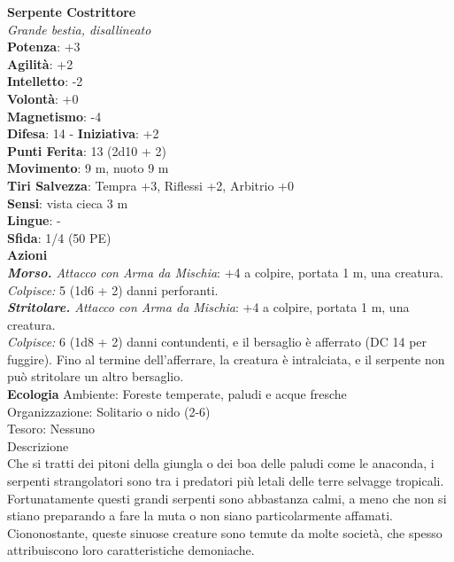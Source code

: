\begin{multicols}{2}
\medskip\textbf{Serpente Costrittore}\\
\emph{Grande bestia, disallineato}\\
\textbf{Potenza}: +3\\
\textbf{Agilità}: +2\\
\textbf{Intelletto}: -2\\
\textbf{Volontà}: +0\\
\textbf{Magnetismo}: -4\\
\textbf{Difesa}: 14 - \textbf{Iniziativa}: +2\\
\textbf{Punti Ferita}: 13 (2d10 + 2)\\
\textbf{Movimento}: 9 m, nuoto 9 m\\
\textbf{Tiri Salvezza}: Tempra +3, Riflessi +2, Arbitrio +0\\
\textbf{Sensi}: vista cieca 3 m\\
\textbf{Lingue}: -\\
\textbf{Sfida}: 1/4 (50 PE)\smallskip\\
\smallskip\textbf{Azioni}\\
\emph{\textbf{Morso.} Attacco con Arma da Mischia}: +4 a colpire, portata 1 m, una creatura.\\
\emph{Colpisce:} 5 (1d6 + 2) danni perforanti.\\
\emph{\textbf{Stritolare.} Attacco con Arma da Mischia}: +4 a colpire, portata 1 m, una creatura.\\
\emph{Colpisce:} 6 (1d8 + 2) danni contundenti, e il bersaglio è afferrato (DC 14 per fuggire). Fino al termine dell'afferrare, la creatura è intralciata, e il serpente non può stritolare un altro bersaglio.\\
\textbf{Ecologia}
Ambiente: Foreste temperate, paludi e acque fresche\\
Organizzazione: Solitario o nido (2-6)\\
Tesoro: Nessuno\\
Descrizione\\
Che si tratti dei pitoni della giungla o dei boa delle paludi come le anaconda, i serpenti strangolatori sono tra i predatori più letali delle terre selvagge tropicali. Fortunatamente questi grandi serpenti sono abbastanza calmi, a meno che non si stiano preparando a fare la muta o non siano particolarmente affamati. Ciononostante, queste sinuose creature sono temute da molte società, che spesso attribuiscono loro caratteristiche demoniache.\\


\end{multicols}
